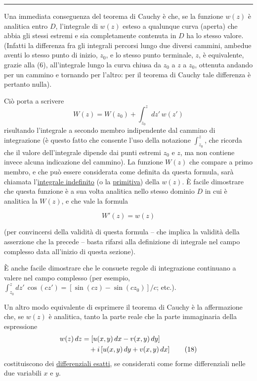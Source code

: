 \documentclass[11pt, a4paper]{book}
\numberwithin{equation}{section}
\begin{document}
\medskip\hrule\medskip

Una immediata conseguenza del teorema di Cauchy è che, se la funzione $w(z)$ è analitica entro $D$, l'integrale di $w(z)$ esteso a qualunque curva (aperta) che abbia gli stessi estremi e sia completamente contenuta in $D$ ha lo stesso valore. (Infatti la differenza fra gli integrali percorsi lungo due diversi cammini, ambedue aventi lo stesso punto di inizio, $z_0$, e lo stesso punto terminale, $z$, è equivalente, grazie alla (6), all'integrale lungo la curva chiusa da $z_0$ a $z$ a $z_0$, ottenuta andando per un cammino e tornando per l'altro: per il teorema di Cauchy tale differenza è pertanto nulla).

Ciò porta a scrivere
\begin{equation}
W(z) = W(z_0) + \int_{z_0}^{z} dz'\, w(z') \tag{16}
\end{equation}
risultando l'integrale a secondo membro indipendente dal cammino di integrazione (è questo fatto che consente l'uso della notazione $\int_{z_0}^{z}$, che ricorda che il valore dell'integrale dipende dai punti estremi $z_0$ e $z$, ma non contiene invece alcuna indicazione del cammino). La funzione $W(z)$ che compare a primo membro, e che può essere considerata come definita da questa formula, sarà chiamata l'\underline{integrale indefinito} (o la \underline{primitiva}) della $w(z)$. È facile dimostrare che questa funzione è a sua volta analitica nello stesso dominio $D$ in cui è analitica la $W(z)$, e che vale la formula

\begin{equation}
W'(z) = w(z) \tag{17}
\end{equation}

(per convincersi della validità di questa formula -- che implica la validità della asserzione che la precede -- basta rifarsi alla definizione di integrale nel campo complesso data all'inizio di questa sezione).

È anche facile dimostrare che le consuete regole di integrazione continuano a valere nel campo complesso (per esempio, $\int_{z_0}^{z} dz'\, \cos(cz') = \left[\sin(cz) - \sin(cz_0)\right]/c$; etc.).

Un altro modo equivalente di esprimere il teorema di Cauchy è la affermazione che, se $w(z)$ è analitica, tanto la parte reale che la parte immaginaria della espressione
\begin{align}
w(z)\, dz &= \left[u(x,y)\, dx - v(x,y)\, dy\right] \notag \\
&\quad + i\left[u(x,y)\, dy + v(x,y)\, dx\right] \tag{18}
\end{align}
costituiscono dei \underline{differenziali esatti}, se considerati come forme differenziali nelle due variabili $x$ e $y$.
\end{document}
